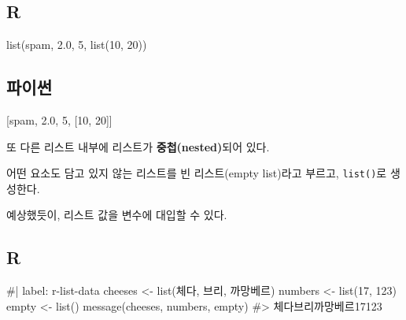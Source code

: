 \documentclass[
  letterpaper,
]{book}
\newenvironment{Shaded}{\begin{snugshade}}{\end{snugshade}}
\newcommand{\DecValTok}[1]{\textcolor[rgb]{0.68,0.00,0.00}{#1}}
\newcommand{\FloatTok}[1]{\textcolor[rgb]{0.68,0.00,0.00}{#1}}
\newcommand{\FunctionTok}[1]{\textcolor[rgb]{0.28,0.35,0.67}{#1}}
\newcommand{\NormalTok}[1]{\textcolor[rgb]{0.00,0.23,0.31}{#1}}
\newcommand{\StringTok}[1]{\textcolor[rgb]{0.13,0.47,0.30}{#1}}
\begin{document}
\subsection*{R}\label{r-44}

\begin{Shaded}
\begin{Highlighting}[]
\FunctionTok{list}\NormalTok{(}\StringTok{\textquotesingle{}spam\textquotesingle{}}\NormalTok{, }\FloatTok{2.0}\NormalTok{, }\DecValTok{5}\NormalTok{, }\FunctionTok{list}\NormalTok{(}\DecValTok{10}\NormalTok{, }\DecValTok{20}\NormalTok{))}
\end{Highlighting}
\end{Shaded}

\subsection*{파이썬}\label{uxd30cuxc774uxc36c-44}

\begin{Shaded}
\begin{Highlighting}[]
\NormalTok{[}\StringTok{\textquotesingle{}spam\textquotesingle{}}\NormalTok{, }\FloatTok{2.0}\NormalTok{, }\DecValTok{5}\NormalTok{, [}\DecValTok{10}\NormalTok{, }\DecValTok{20}\NormalTok{]]}
\end{Highlighting}
\end{Shaded}

또 다른 리스트 내부에 리스트가 \textbf{중첩(nested)}되어 있다.
 

어떤 요소도 담고 있지 않는 리스트를 빈 리스트(empty list)라고 부르고,
\texttt{list()}로 생성한다.  

예상했듯이, 리스트 값을 변수에 대입할 수 있다.

\subsection{R}

\begin{Shaded}
\begin{Highlighting}[]
\NormalTok{\#| label: r{-}list{-}data}
\NormalTok{cheeses \textless{}{-} list(\textquotesingle{}체다\textquotesingle{}, \textquotesingle{}브리\textquotesingle{}, \textquotesingle{}까망베르\textquotesingle{})}
\NormalTok{numbers \textless{}{-} list(17, 123)}
\NormalTok{empty \textless{}{-} list()}
\NormalTok{message(cheeses, numbers, empty)}
\NormalTok{\#\textgreater{} 체다브리까망베르17123}
\end{Highlighting}
\end{Shaded}
\end{document}
